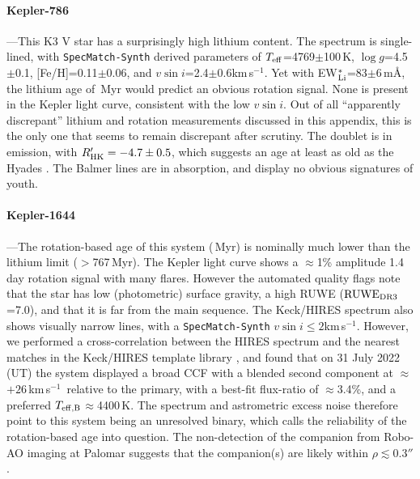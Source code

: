 \documentclass[11pt,twocolumn,tighten,linenumbers]{aastex63}
\newcommand{\kms}{{km\,s$^{-1}$}}
\begin{document}


\paragraph{Kepler-786}---This K3 V star has a surprisingly high
lithium content.  The spectrum is single-lined, with
\texttt{SpecMatch-Synth} derived parameters of $T_{\rm
eff}$=4769$\pm$100\,K, $\log g$=4.5$\pm$0.1, [Fe/H]=0.11$\pm$0.06, and
$v\sin i$=2.4$\pm$0.6\kms.  Yet with EW$_{\rm
Li}^{\ast}$=83$\pm$6\,m\AA, the lithium age of \kepseveneightsix\,Myr
would predict an obvious rotation signal.  None is present in the
Kepler light curve, consistent with the low $v\sin i$.  Out of all
``apparently discrepant'' lithium and rotation measurements discussed
in this appendix, this is the only one that seems to remain discrepant
after scrutiny.  The   doublet is in emission, with
$R'_{\rm HK}=-4.7\pm0.5$, which suggests an age at least as old as the
Hyades \citep{Mamajek_2008}.  The Balmer lines are in absorption, and
display no obvious signatures of youth.


\paragraph{Kepler-1644}---The rotation-based age of this system
(\kepsixteenfourfour\,Myr) is nominally much lower than the lithium
limit ($>$767\,Myr).  The Kepler light curve shows a $\approx$1\%
amplitude 1.4\,day rotation signal with many flares.  However the
automated quality flags note that the star has low (photometric)
surface gravity, a high RUWE (${\rm RUWE}_{\rm DR3}$=7.0), and that it
is far from the main sequence.  The Keck/HIRES spectrum also shows
visually narrow lines, with a \texttt{SpecMatch-Synth} $v \sin i \leq
2$\kms.  However, we performed a cross-correlation between the HIRES
spectrum and the nearest matches in the Keck/HIRES template library
\citep{2015AJ....149...18K}, and found that on 31 July 2022 (UT) the
system displayed a broad CCF with a blended second component at
$\approx$$+26$\,\kms\ relative to the primary, with a best-fit
flux-ratio of $\approx$3.4\%, and a preferred $T_{\rm
eff,B}$$\approx$4400\,K.  The spectrum and astrometric excess noise
therefore point to this system being an unresolved binary, which calls
the reliability of the rotation-based age into question.  The
non-detection of the companion from Robo-AO imaging at Palomar
\citep{2017AJ....153...66Z} suggests that the companion(s) are likely
within $\rho$$\lesssim$0.3$''$.
\end{document}
